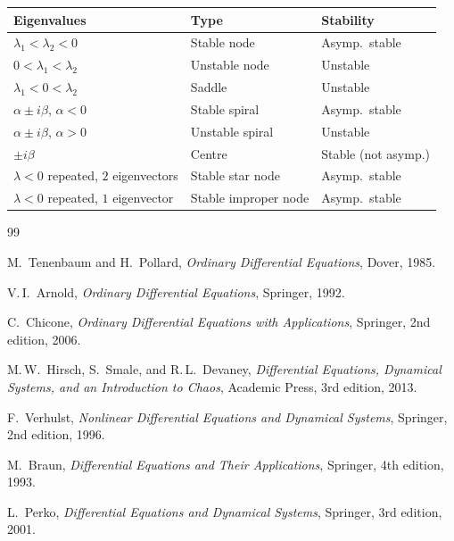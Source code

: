 \documentclass[12pt,a4paper,openany]{book}
\theoremstyle{definition}
\theoremstyle{plain}
\theoremstyle{remark}
\begin{document}
\begin{center}
\begin{tabular}{@{}lll@{}}
\toprule
\textbf{Eigenvalues} & \textbf{Type} & \textbf{Stability} \\
\midrule
$\lambda_{1}<\lambda_{2}<0$ & Stable node & Asymp.\ stable \\
$0<\lambda_{1}<\lambda_{2}$ & Unstable node & Unstable \\
$\lambda_{1}<0<\lambda_{2}$ & Saddle & Unstable \\
$\alpha\pm i\beta$, $\alpha<0$ & Stable spiral & Asymp.\ stable \\
$\alpha\pm i\beta$, $\alpha>0$ & Unstable spiral & Unstable \\
$\pm i\beta$ & Centre & Stable (not asymp.) \\
$\lambda<0$ repeated, $2$ eigenvectors & Stable star node &
  Asymp.\ stable \\
$\lambda<0$ repeated, $1$ eigenvector & Stable improper node &
  Asymp.\ stable \\
\bottomrule
\end{tabular}
\end{center}

\begin{thebibliography}{99}

M.~Tenenbaum and H.~Pollard,
\emph{Ordinary Differential Equations},
Dover, 1985.

V.\,I.~Arnold,
\emph{Ordinary Differential Equations},
Springer, 1992.

C.~Chicone,
\emph{Ordinary Differential Equations with Applications},
Springer, 2nd edition, 2006.

M.\,W.~Hirsch, S.~Smale, and R.\,L.~Devaney,
\emph{Differential Equations, Dynamical Systems, and an Introduction
to Chaos},
Academic Press, 3rd edition, 2013.

F.~Verhulst,
\emph{Nonlinear Differential Equations and Dynamical Systems},
Springer, 2nd edition, 1996.

M.~Braun,
\emph{Differential Equations and Their Applications},
Springer, 4th edition, 1993.

L.~Perko,
\emph{Differential Equations and Dynamical Systems},
Springer, 3rd edition, 2001.

\end{thebibliography}

\printindex
\end{document}

